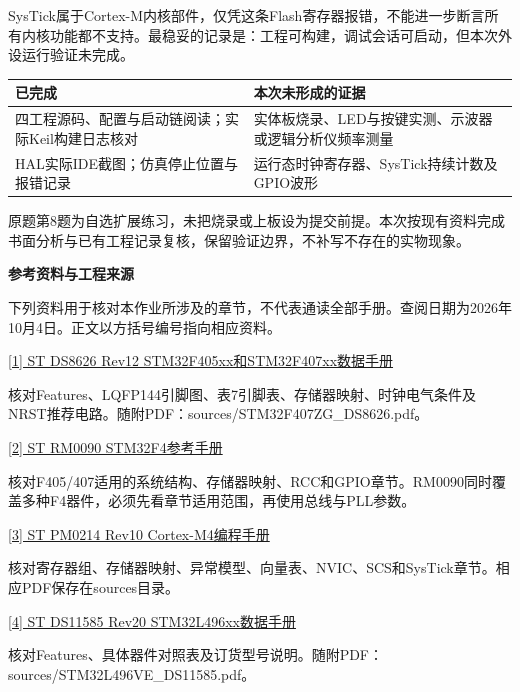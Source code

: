 \documentclass[10pt,a4paper]{article}
\newcommand{\qtitle}[1]{{\Large\bfseries #1}\par\vspace{4pt}}
\begin{document}
SysTick属于Cortex-M内核部件，仅凭这条Flash寄存器报错，不能进一步断言所有内核功能都不支持。最稳妥的记录是：工程可构建，调试会话可启动，但本次外设运行验证未完成。

\begingroup\small
\begin{tabularx}{\linewidth}{|>{\hsize}Y|>{\hsize}Y|}\hline
{}
\textbf{已完成} & \textbf{本次未形成的证据} \\ \hline
四工程源码、配置与启动链阅读；实际Keil构建日志核对 & 实体板烧录、LED与按键实测、示波器或逻辑分析仪频率测量 \\ \hline
HAL实际IDE截图；仿真停止位置与报错记录 & 运行态时钟寄存器、SysTick持续计数及GPIO波形 \\ \hline
\end{tabularx}
\endgroup\par
原题第8题为自选扩展练习，未把烧录或上板设为提交前提。本次按现有资料完成书面分析与已有工程记录复核，保留验证边界，不补写不存在的实物现象。


\clearpage
{}
\qtitle{参考资料与工程来源}
下列资料用于核对本作业所涉及的章节，不代表通读全部手册。查阅日期为2026年10月4日。正文以方括号编号指向相应资料。

\href{https://www.st.com/resource/en/datasheet/stm32f407zg.pdf}{[1] ST DS8626 Rev12 STM32F405xx和STM32F407xx数据手册}\par
核对Features、LQFP144引脚图、表7引脚表、存储器映射、时钟电气条件及NRST推荐电路。随附PDF：sources/\allowbreak{}STM32F407ZG\_\allowbreak{}DS8626.pdf。

\href{https://www.st.com/resource/en/reference_manual/dm00031020-stm32f405415-stm32f407417-stm32f427437-and-stm32f429439-advanced-armbased-32bit-mcus-stmicroelectronics.pdf}{[2] ST RM0090 STM32F4参考手册}\par
核对F405/\allowbreak{}407适用的系统结构、存储器映射、RCC和GPIO章节。RM0090同时覆盖多种F4器件，必须先看章节适用范围，再使用总线与PLL参数。

\href{https://www.st.com/resource/en/programming_manual/pm0214-stm32-cortexm4-mcus-and-mpus-programming-manual-stmicroelectronics.pdf}{[3] ST PM0214 Rev10 Cortex-M4编程手册}\par
核对寄存器组、存储器映射、异常模型、向量表、NVIC、SCS和SysTick章节。相应PDF保存在sources目录。

\href{https://www.st.com/resource/en/datasheet/stm32l496ve.pdf}{[4] ST DS11585 Rev20 STM32L496xx数据手册}\par
核对Features、具体器件对照表及订货型号说明。随附PDF：sources/\allowbreak{}STM32L496VE\_\allowbreak{}DS11585.pdf。
\end{document}
